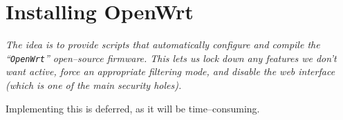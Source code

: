 %
%
\clearpage
\section{Installing OpenWrt}


{\itshape The idea is to provide scripts that automatically configure and
compile the ``\verb+OpenWrt+'' open--source firmware. This lets us lock down
any features we don't want active, force an appropriate filtering mode, and
disable the web interface (which is one of the main security holes).

Implementing this is deferred, as it will be time--consuming.}

%
